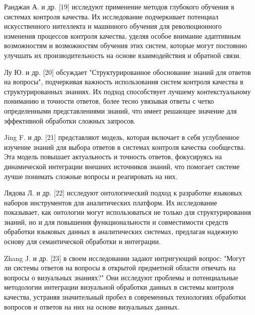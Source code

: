 Ранджан А. и др. {[}19{]} исследуют применение методов глубокого
обучения в системах контроля качества. Их исследование подчеркивает
потенциал искусственного интеллекта и машинного обучения для
революционного изменения процессов контроля качества, уделяя особое
внимание адаптивным возможностям и возможностям обучения этих систем,
которые могут постоянно улучшать их производительность на основе
взаимодействия и обратной связи.

Лу Ю. и др. {[}20{]} обсуждает "Структурированное обоснование знаний для
ответов на вопросы", подчеркивая важность использования систем контроля
качества в структурированных знаниях. Их подход способствует лучшему
контекстуальному пониманию и точности ответов, более тесно увязывая
ответы с четко определенными представлениями знаний, что имеет решающее
значение для эффективной обработки сложных запросов.

Jing F. и др. {[}21{]} представляют модель, которая включает в себя
углубленное изучение знаний для выбора ответов в системах контроля
качества сообщества. Эта модель повышает актуальность и точность
ответов, фокусируясь на динамической интеграции внешних источников
знаний, что помогает системе лучше понимать сложные вопросы и
реагировать на них.

Лядова Л. и др. {[}22{]} исследуют онтологический подход к разработке
языковых наборов инструментов для аналитических платформ. Их
исследование показывает, как онтологии могут использоваться не только
для структурирования знаний, но и для повышения функциональности и
совместимости средств обработки языковых данных в аналитических
системах, предлагая надежную основу для семантической обработки и
интеграции.

Zhang J. и др. {[}23{]} в своем исследовании задают интригующий вопрос:
"Могут ли системы ответов на вопросы в открытой предметной области
отвечать на вопросы о визуальных знаниях?" Они исследуют проблемы и
потенциальные методологии интеграции визуальной обработки данных в
системы контроля качества, устраняя значительный пробел в современных
технологиях обработки вопросов и ответов на них на основе визуальных
данных.


